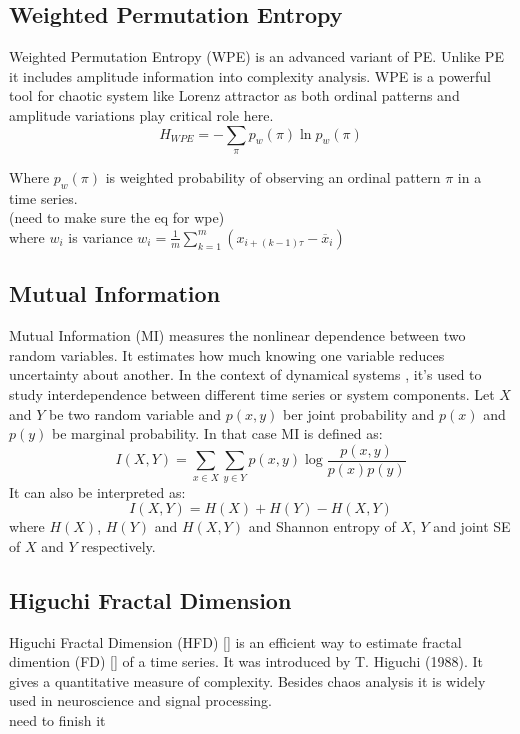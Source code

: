 \documentclass[%
 reprint,
 amsmath,amssymb,
 aps,
 floatfix,
]{revtex4-2}
\begin{document}
\subsection{Weighted Permutation Entropy}
Weighted Permutation Entropy (WPE) is an advanced variant of PE. Unlike PE it includes amplitude information into complexity analysis. WPE is a powerful tool for chaotic system like Lorenz attractor as both ordinal patterns and amplitude variations play critical role here.
\begin{equation} 
	H_{WPE} = -\sum_{\pi} p_w(\pi) \ln p_w (\pi)
\end{equation} 

Where $p_w(\pi)$ is weighted probability of observing an ordinal pattern $\pi$ in a time series.\\
 (need to make sure the eq for wpe)\\
where $w_i$ is variance $w_i = \frac{1}{m} \sum_{k=1}^{m} (x_{i+(k-1)\tau} - \overline{x}_i) $
\subsection{Mutual Information}
Mutual Information (MI) measures the nonlinear dependence between two random variables. It estimates how much knowing one variable reduces uncertainty about another. In the context of dynamical systems , it's used to study interdependence between different time series or system components. Let $X$ and $Y$ be two random variable and $p(x,y)$ ber joint probability and $p(x)$ and $p(y)$ be marginal probability. In that case MI is defined as:
\begin{equation}
	I(X,Y) = \sum_{x\in X} \sum_{y\in Y} p(x,y) \log \frac{p(x,y)}{p(x)p(y)}
\end{equation}
It can also be interpreted as:
\begin{equation}
	I(X,Y) = H(X) + H(Y) - H(X,Y)
\end{equation}
where $H(X)$, $H(Y)$ and $H(X,Y)$ and Shannon entropy of $X$, $Y$ and joint SE of $X$ and $Y$ respectively.
\subsection{Higuchi Fractal Dimension}
Higuchi Fractal Dimension (HFD) [] is an efficient way to estimate fractal dimention (FD) [] of a time series. It was introduced by T. Higuchi (1988). It gives a quantitative measure of complexity. Besides chaos analysis it is widely used in neuroscience and signal processing.\\
need to finish it
\end{document}
